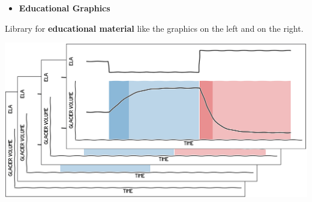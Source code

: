 \documentclass[final]{beamer}
\newcommand*{\smalllogo}[1]{%
	\raisebox{-.3\baselineskip}{%
		\texttt{[image: \#1]}%
	}%
}
\begin{document}
\begin{frame}[fragile]
\begin{columns}
\begin{rightcolumn}
\hspace*{42cm}
\vspace*{-2.5cm}

	\begin{boxblock}{}
		\begin{minipage}[t]{0.45\textwidth}
				\begin{itemize}	\item[\smalllogo{gluehbirne.png}] {\textbf{Educational Graphics}} \end{itemize}
						Library for \textbf{educational material} like the graphics on the left and on the right.
		\end{minipage}
	\hfill
		\begin{minipage}[t]{0.35\textwidth}
						\vspace{0pt}
						\includegraphics[width=1.0\textwidth]{ELA_Bilder}
		\end{minipage}
	\end{boxblock}

\hspace*{42cm}
\vspace*{-1cm}


\end{rightcolumn}
\end{columns}
\end{frame}
\end{document}
